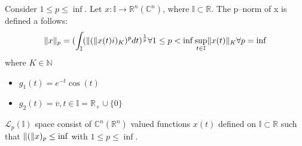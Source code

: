 \documentclass{report}
\begin{document}

{
Consider $ 1 \leq p \leq \inf$. Let $x: \mathbb{I} \longrightarrow \mathbb{R}^n(\mathbb{C}^n)$, where $\mathbb{I}\subset \mathbb{R}$. The p--norm of x is defined a follows:
\begin{equation}
\lVert x\rVert_p = (\int_{\mathbb{I}} (\lVert(\rVert x(t)i)_K)^{p}dt)^{\frac{1}{p}} \forall 1 \le p < \inf
	\sup_{t \in \mathbb{I}} \lVert x(t)\rVert_K \forall p = \inf 
\end{equation}
where $K \in \mathbb{N}$
}

{
\begin{itemize}
\item $g_1(t) = e^{-t}\cos(t)$
\item $g_2(t) = \overline{v} , t \in \mathbb{I} =\mathbb{R}_+\cup\{0\}$ %
\end{itemize}
}

{
$\mathcal{L}_p(\mathbb{I})$ space consist of $\mathbb{C}^{n}(\mathbb{R}^{n})$ valued functions $x(t)$ defined on $\mathbb{I} \subset \mathbb{R}$ such that $\lVert(\rVert x)_p \le \inf$ with  $ 1 \le p \le \inf$.
}
\end{document}
